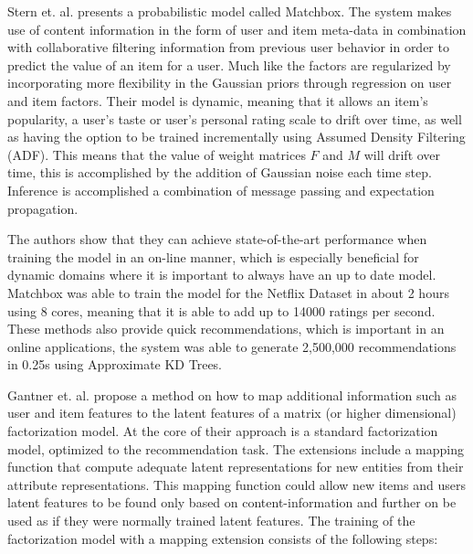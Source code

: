 
Stern et. al. \cite{Stern2009} presents a probabilistic model called Matchbox.
The system makes use of content information in the form of user and item
meta-data in combination with collaborative filtering information from previous
user behavior in order to predict the value of an item for a user. Much like
\cite{Agarwal2009} the factors are regularized by incorporating more
flexibility in the Gaussian priors through regression on user and item factors.
Their model is dynamic, meaning that it allows an item's popularity, a user's
taste or user's personal rating scale to drift over time, as well as having the
option to be trained incrementally using Assumed Density Filtering (ADF). This
means that the value of weight matrices $F$ and $M$ will drift over time, this
is accomplished by the addition of Gaussian noise each time step. Inference is
accomplished a combination of message passing and expectation propagation.

The authors show that they can achieve state-of-the-art performance when
training the model in an on-line manner, which is especially beneficial for
dynamic domains where it is important to always have an up to date model.
Matchbox was able to train the model for the Netflix Dataset in about 2 hours
using 8 cores, meaning that it is able to add up to 14000 ratings per second.
These methods also provide quick recommendations, which is important in an
online applications, the system was able to generate 2,500,000 recommendations
in 0.25s using Approximate KD Trees.


Gantner et. al. \cite{Gantner2010} propose a method on how to map additional
information such as user and item features to the latent features of a matrix
(or higher dimensional) factorization model. At the core of their approach is a
standard factorization model, optimized to the recommendation task. The
extensions include a mapping function that compute adequate latent
representations for new entities from their attribute representations. This
mapping function could allow new items and users latent features to be found
only based on content-information and further on be used as if they were
normally trained latent features. The training of the factorization model with
a mapping extension consists of the following steps:

